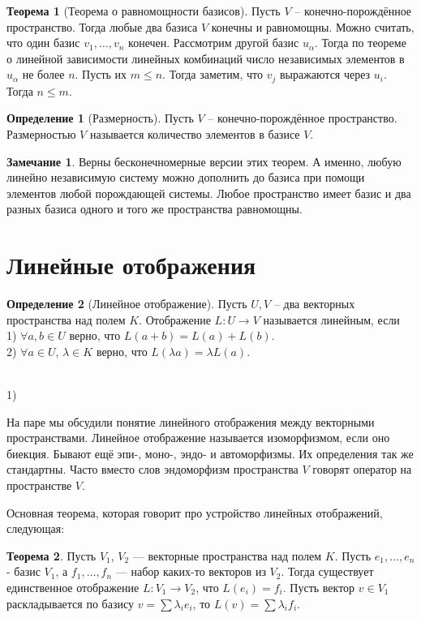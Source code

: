 \documentclass[10pt,a4paper,oneside]{book}
\theoremstyle{definition}
\newtheorem*{rem}{Замечание}
\newtheorem{defn}{Определение}
\newtheorem{thm}{Теорема}
\def\exm{\noindent {\bf Примеры:}}
\def\thrm{\begin{thm}}
\def\ethrm{\end{thm}}
\def\dfn{\begin{defn}}
\def\edfn{\end{defn}}
\def\rm{\begin{rem}}
\def\erm{\end{rem}}
\begin{document}
\thrm[Теорема о равномощности базисов] Пусть $V$ -- конечно-порождённое пространство. Тогда любые два базиса $V$ конечны и равномощны.
\proof Можно считать, что один базис $v_1,\dots,v_n$ конечен. Рассмотрим другой базис $u_{\alpha}$. Тогда по теореме о линейной зависимости линейных комбинаций число независимых элементов в $u_{\alpha}$ не более $n$. Пусть их $m\leq n$. Тогда заметим, что $v_j$ выражаются через $u_i$. Тогда $n\leq m$.
\endproof
\ethrm

\dfn[Размерность] Пусть $V$ -- конечно-порождённое пространство. Размерностью $V$ называется количество элементов в базисе $V$.
\edfn


\rm Верны бесконечномерные версии этих теорем. А именно, любую линейно независимую систему можно дополнить до базиса при помощи элементов любой порождающей системы. Любое пространство имеет базис и два разных базиса одного и того же пространства равномощны.
\erm



\section{Линейные отображения}

\dfn[Линейное отображение] Пусть $U,V$ -- два векторных пространства над полем $K$. Отображение $L\colon U \to V$ называется линейным, если\\
1) $\forall a,b \in U$ верно, что $L(a+b)=L(a)+L(b)$.\\
2) $\forall a \in U$, $\lambda \in K$ верно, что $L(\lambda a)=\lambda L(a)$.
\edfn

\exm\\
1) 


На паре мы обсудили понятие линейного отображения между векторными пространствами. Линейное отображение называется изоморфизмом, если оно биекция. Бывают ещё эпи-, моно-, эндо- и автоморфизмы. Их определения так же стандартны. Часто вместо слов эндоморфизм пространства $V$ говорят оператор на пространстве $V$.

Основная теорема, которая говорит про устройство линейных отображений, следующая:
\begin{thm}
Пусть $V_1$, $V_2$ --- векторные пространства над полем $K$. Пусть $e_1,\dots,e_n$ - базис $V_1$, а $f_1,\dots,f_n$ --- набор каких-то векторов из $V_2$. Тогда существует единственное отображение $L\colon V_1 \to V_2$, что $L(e_i)=f_i$. Пусть вектор $v\in V_1$ раскладывается по базису $v=\sum \lambda_i e_i$, то $L(v)=\sum \lambda_i f_i$.
\end{thm}
\end{document}
